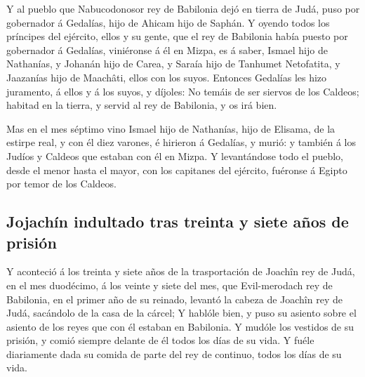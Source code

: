  Y al pueblo que Nabucodonosor rey de Babilonia dejó en
tierra de Judá, puso por gobernador á Gedalías, hijo de Ahicam hijo de
Saphán.  Y oyendo todos los príncipes del ejército, ellos
y su gente, que el rey de Babilonia había puesto por gobernador á
Gedalías, viniéronse á él en Mizpa, es á saber, Ismael hijo de
Nathanías, y Johanán hijo de Carea, y Saraía hijo de Tanhumet
Netofatita, y Jaazanías hijo de Maachâti, ellos con los suyos.
 Entonces Gedalías les hizo juramento, á ellos y á los
suyos, y díjoles: No temáis de ser siervos de los Caldeos; habitad en la
tierra, y servid al rey de Babilonia, y os irá bien.

 Mas en el mes séptimo vino Ismael hijo de Nathanías,
hijo de Elisama, de la estirpe real, y con él diez varones, é hirieron á
Gedalías, y murió: y también á los Judíos y Caldeos que estaban con él
en Mizpa.  Y levantándose todo el pueblo, desde el menor
hasta el mayor, con los capitanes del ejército, fuéronse á Egipto por
temor de los Caldeos.

\hypertarget{jojachuxedn-indultado-tras-treinta-y-siete-auxf1os-de-prisiuxf3n}{%
\subsection{Jojachín indultado tras treinta y siete años de
prisión}\label{jojachuxedn-indultado-tras-treinta-y-siete-auxf1os-de-prisiuxf3n}}

 Y aconteció á los treinta y siete años de la
trasportación de Joachîn rey de Judá, en el mes duodécimo, á los veinte
y siete del mes, que Evil-merodach rey de Babilonia, en el primer año de
su reinado, levantó la cabeza de Joachîn rey de Judá, sacándolo de la
casa de la cárcel;  Y hablóle bien, y puso su asiento
sobre el asiento de los reyes que con él estaban en Babilonia.
 Y mudóle los vestidos de su prisión, y comió siempre
delante de él todos los días de su vida.  Y fuéle
diariamente dada su comida de parte del rey de continuo, todos los días
de su vida.
